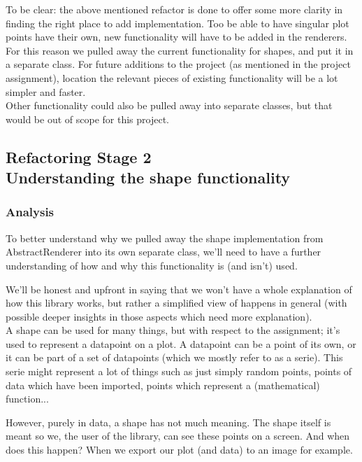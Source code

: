 \documentclass{article}
\begin{document}
To be clear: the above mentioned refactor is done to offer some more clarity in finding the right place to add implementation. Too be able to have singular plot points have their own, new functionality will have to be added in the renderers. For this reason we pulled away the current functionality for shapes, and put it in a separate class. For future additions to the project (as mentioned in the project assignment), location the relevant pieces of existing functionality will be a lot simpler and faster.\\

Other functionality could also be pulled away into separate classes, but that would be out of scope for this project.

\subsection[Section Title. Section Subtitle]{Refactoring Stage 2\\ {\large Understanding the shape functionality}}

\subsubsection{Analysis}

To better understand why we pulled away the shape implementation from AbstractRenderer into its own separate class, we'll need to have a further understanding of how and why this functionality is (and isn't) used.

We'll be honest and upfront in saying that we won't have a whole explanation of how this library works, but rather a simplified view of happens in general (with possible deeper insights in those aspects which need more explanation).\\

A shape can be used for many things, but with respect to the assignment; it's used to represent a datapoint on a plot. A datapoint can be a point of its own, or it can be part of a set of datapoints (which we mostly refer to as a serie). This serie might represent a lot of things such as just simply random points, points of data which have been imported, points which represent a (mathematical) function... 

However, purely in data, a shape has not much meaning. The shape itself is meant so we, the user of the library, can see these points on a screen. And when does this happen? When we export our plot (and data) to an image for example.\\
\end{document}
